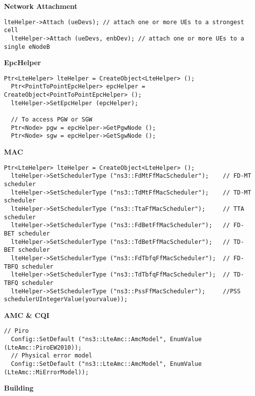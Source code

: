 \textbf{Network Attachment}

\begin{lstlisting}[language=myC++,caption={UE Automatic Attachment}, captionpos=b]
  lteHelper->Attach (ueDevs); // attach one or more UEs to a strongest cell
  lteHelper->Attach (ueDevs, enbDev); // attach one or more UEs to a single eNodeB
\end{lstlisting}


\textbf{EpcHelper}

\begin{lstlisting}[language=myC++,caption={Enable Evolved Packet Core}, captionpos=b]
  Ptr<LteHelper> lteHelper = CreateObject<LteHelper> ();
  Ptr<PointToPointEpcHelper> epcHelper = CreateObject<PointToPointEpcHelper> ();
  lteHelper->SetEpcHelper (epcHelper);

  // To access PGW or SGW 
  Ptr<Node> pgw = epcHelper->GetPgwNode ();
  Ptr<Node> sgw = epcHelper->GetSgwNode ();
\end{lstlisting}

\textbf{MAC}

\begin{lstlisting}[language=myC++,caption={MAC Scheduler}, captionpos=b]
  Ptr<LteHelper> lteHelper = CreateObject<LteHelper> ();
  lteHelper->SetSchedulerType ("ns3::FdMtFfMacScheduler");    // FD-MT scheduler
  lteHelper->SetSchedulerType ("ns3::TdMtFfMacScheduler");    // TD-MT scheduler
  lteHelper->SetSchedulerType ("ns3::TtaFfMacScheduler");     // TTA scheduler
  lteHelper->SetSchedulerType ("ns3::FdBetFfMacScheduler");   // FD-BET scheduler
  lteHelper->SetSchedulerType ("ns3::TdBetFfMacScheduler");   // TD-BET scheduler
  lteHelper->SetSchedulerType ("ns3::FdTbfqFfMacScheduler");  // FD-TBFQ scheduler
  lteHelper->SetSchedulerType ("ns3::TdTbfqFfMacScheduler");  // TD-TBFQ scheduler
  lteHelper->SetSchedulerType ("ns3::PssFfMacScheduler");     //PSS schedulerUIntegerValue(yourvalue)); 
\end{lstlisting}

\textbf{AMC \& CQI}

\begin{lstlisting}[language=myC++,caption={AMC Model}, captionpos=b]
  // Piro
  Config::SetDefault ("ns3::LteAmc::AmcModel", EnumValue (LteAmc::PiroEW2010));
  // Physical error model
  Config::SetDefault ("ns3::LteAmc::AmcModel", EnumValue (LteAmc::MiErrorModel));
\end{lstlisting}

\textbf{Building}


